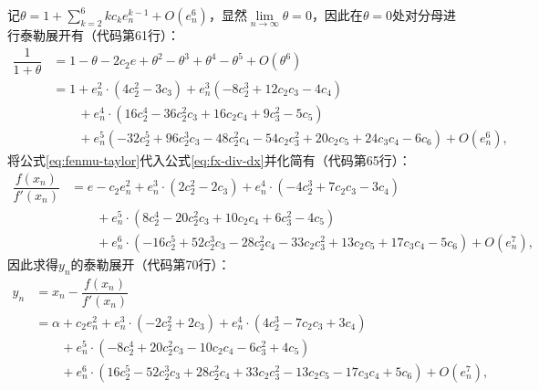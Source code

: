 记$\theta = 1 + \sum\limits_{k=2}^6 kc_ke_n^{k-1} + O(e_n^6) $，显然$\lim\limits_{n\to \infty}\theta = 0$，因此在$\theta = 0$处对分母进行泰勒展开有（代码第61行）：
\begin{equation}
    \label{eq:fenmu-taylor}
    \begin{aligned}
        \dfrac{1}{1+\theta} &= 1 - \theta - 2 c_{2} e + \theta^2 - \theta^3 + \theta^4 - \theta^5 + O(\theta^6) \\
        &= 1 + e_n^{2} \cdot \left(4 c_{2}^{2} - 3 c_{3}\right) + e_n^{3} \left(- 8 c_{2}^{3} + 12 c_{2} c_{3} - 4 c_{4}\right) \\
        &\qquad + e_n^{4} \cdot \left(16 c_{2}^{4} - 36 c_{2}^{2} c_{3} + 16 c_{2} c_{4} + 9 c_{3}^{2} - 5 c_{5}\right) \\
        &\qquad + e_n^{5} \left(- 32 c_{2}^{5} + 96 c_{2}^{3} c_{3} - 48 c_{2}^{2} c_{4} - 54 c_{2} c_{3}^{2} + 20 c_{2} c_{5} + 24 c_{3} c_{4} - 6 c_{6}\right) + O\left(e_n^{6}\right),
    \end{aligned}
\end{equation}
将公式\ref{eq:fenmu-taylor}代入公式\ref{eq:fx-div-dx}并化简有（代码第65行）：
\begin{equation}
    \begin{aligned}
        \dfrac{f(x_n)}{f'(x_n)} &= e - c_{2} e_n^{2} + e_n^{3} \cdot \left(2 c_{2}^{2} - 2 c_{3}\right) + e_n^{4} \cdot \left(- 4 c_{2}^{3} + 7 c_{2} c_{3} - 3 c_{4}\right) \\
        &\qquad + e_n^{5} \cdot \left(8 c_{2}^{4} - 20 c_{2}^{2} c_{3} + 10 c_{2} c_{4} + 6 c_{3}^{2} - 4 c_{5}\right) \\
        &\qquad + e_n^{6} \cdot \left(- 16 c_{2}^{5} + 52 c_{2}^{3} c_{3} - 28 c_{2}^{2} c_{4} - 33 c_{2} c_{3}^{2} + 13 c_{2} c_{5} + 17 c_{3} c_{4} - 5 c_{6}\right) + O\left(e_n^{7}\right),
    \end{aligned}
\end{equation}
因此求得$y_n$的泰勒展开（代码第70行）：
\begin{equation}
    \label{eq:taylor-y}
    \begin{aligned}
        y_n &= x_n - \dfrac{f(x_n)}{f'(x_n)}\\
        &= \alpha + c_{2} e_n^{2} + e_n^{3} \cdot \left(- 2 c_{2}^{2} + 2 c_{3}\right) + e_n^{4} \cdot \left(4 c_{2}^{3} - 7 c_{2} c_{3} + 3 c_{4}\right) \\
        &\qquad + e_n^{5} \cdot \left(- 8 c_{2}^{4} + 20 c_{2}^{2} c_{3} - 10 c_{2} c_{4} - 6 c_{3}^{2} + 4 c_{5}\right) \\
        &\qquad + e_n^{6} \cdot \left(16 c_{2}^{5} - 52 c_{2}^{3} c_{3} + 28 c_{2}^{2} c_{4} + 33 c_{2} c_{3}^{2} - 13 c_{2} c_{5} - 17 c_{3} c_{4} + 5 c_{6}\right) + O\left(e_n^{7}\right),
    \end{aligned}
\end{equation}
